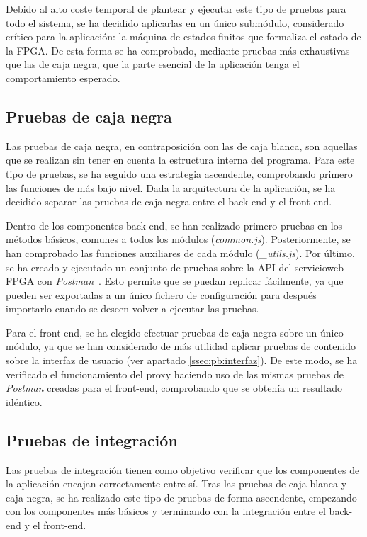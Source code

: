 Debido al alto coste temporal de plantear y ejecutar este tipo de pruebas para todo el sistema, se ha decidido aplicarlas en un único submódulo, considerado crítico para la aplicación: la máquina de estados finitos que formaliza el estado de la \gls{FPGA}.
De esta forma se ha comprobado, mediante pruebas más exhaustivas que las de caja negra, que la parte esencial de la aplicación tenga el comportamiento esperado.

\subsection*{Pruebas de caja negra\label{ssec:pb:caja_negra}}

Las pruebas de caja negra, en contraposición con las de caja blanca, son aquellas que se realizan sin tener en cuenta la estructura interna del programa.
Para este tipo de pruebas, se ha seguido una estrategia ascendente, comprobando primero las funciones de más bajo nivel.
Dada la arquitectura de la aplicación, se ha decidido separar las pruebas de caja negra entre el \gls{back-end} y el \gls{front-end}.

Dentro de los componentes \gls{back-end}, se han realizado primero pruebas en los métodos básicos, comunes a todos los módulos (\textit{common.js}).
Posteriormente, se han comprobado las funciones auxiliares de cada módulo (\textit{\_utils.js}).
Por último, se ha creado y ejecutado un conjunto de pruebas sobre la \gls{API} del \gls{servicioweb} \gls{FPGA} con \textit{Postman}~\cite{postman}.
Esto permite que se puedan replicar fácilmente, ya que pueden ser exportadas a un único fichero de configuración para después importarlo cuando se deseen volver a ejecutar las pruebas.

Para el \gls{front-end}, se ha elegido efectuar pruebas de caja negra sobre un único módulo, ya que se han considerado de más utilidad aplicar pruebas de contenido sobre la interfaz de usuario (ver apartado \ref{ssec:pb:interfaz}).
De este modo, se ha verificado el funcionamiento del \gls{proxy} haciendo uso de las mismas pruebas de \textit{Postman} creadas para el \gls{front-end}, comprobando que se obtenía un resultado idéntico.

\subsection*{Pruebas de integración\label{ssec:pb:integracion}}

Las pruebas de integración tienen como objetivo verificar que los componentes de la aplicación encajan correctamente entre sí.
Tras las pruebas de caja blanca y caja negra, se ha realizado este tipo de pruebas de forma ascendente, empezando con los componentes más básicos y terminando con la integración entre el \gls{back-end} y el \gls{front-end}.

